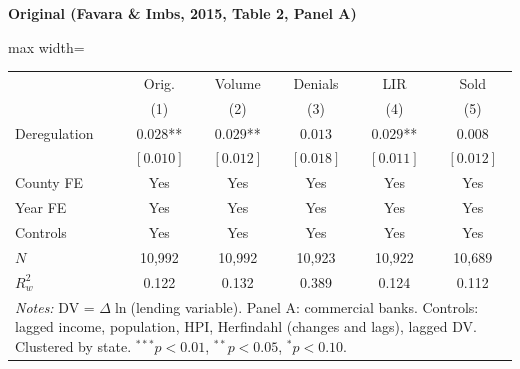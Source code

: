 \documentclass[11pt,a4paper]{article}
\begin{document}
\vspace{0.5cm}
\begin{minipage}[t]{0.48\textwidth}
\centering
\textbf{\large Original (Favara \& Imbs, 2015, Table 2, Panel A)}
\vspace{0.3cm}

\begin{adjustbox}{max width=\textwidth}
\begin{tabular}{lccccc}
\toprule
 & Orig. & Volume & Denials & LIR & Sold \\
 & (1) & (2) & (3) & (4) & (5) \\
\midrule
Deregulation & $0.028$** & $0.029$** & $0.013$ & $0.029$** & $0.008$ \\
 & $[0.010]$ & $[0.012]$ & $[0.018]$ & $[0.011]$ & $[0.012]$ \\[0.3em]
\midrule
County FE & Yes & Yes & Yes & Yes & Yes \\
Year FE & Yes & Yes & Yes & Yes & Yes \\
Controls & Yes & Yes & Yes & Yes & Yes \\
$N$ & 10,992 & 10,992 & 10,923 & 10,922 & 10,689 \\
$R^2_w$ & 0.122 & 0.132 & 0.389 & 0.124 & 0.112 \\
\bottomrule
\multicolumn{6}{p{0.95\textwidth}}{\footnotesize\textit{Notes:} DV = $\Delta\ln$(lending variable). Panel A: commercial banks. Controls: lagged income, population, HPI, Herfindahl (changes and lags), lagged DV. Clustered by state. $^{***}p<0.01$, $^{**}p<0.05$, $^{*}p<0.10$.}
\end{tabular}
\end{adjustbox}
\end{minipage}%
\hfill
\end{document}
